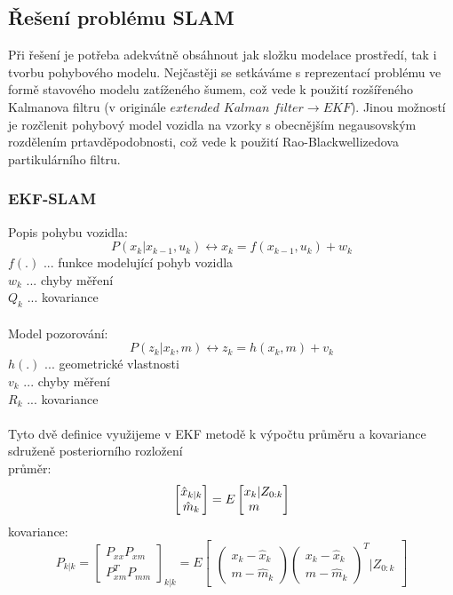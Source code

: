 \documentclass[11pt]{article}
\begin{document}
\subsection{Řešení problému SLAM}
Při řešení je potřeba adekvátně obsáhnout jak složku modelace prostředí, tak i tvorbu pohybového modelu. Nejčastěji se setkáváme s reprezentací problému ve formě stavového modelu zatíženého šumem, což vede k použití rozšířeného Kalmanova filtru (v originále $extended$ $Kalman$ $filter\rightarrow EKF$). Jinou možností je rozčlenit pohybový model vozidla na vzorky s obecnějším negausovským rozdělením prtavděpodobnosti, což vede k použití Rao-Blackwellizedova partikulárního filtru. 

\subsubsection{EKF-SLAM}
Popis pohybu vozidla:
$$P(x_k|x_{k-1},u_k)\leftrightarrow x_k=f(x_{k-1},u_k)+w_k$$
$f(.)$ ... funkce modelující pohyb vozidla\\
$w_k$ ... chyby měření\\
$Q_k$ ... kovariance\\
\\
Model pozorování:
$$P(z_k|x_k,m)\leftrightarrow z_k=h(x_k,m)+v_k $$
$h(.)$ ... geometrické vlastnosti\\
$v_k$ ... chyby měření\\
$R_k$ ... kovariance\\
\\
Tyto dvě definice využijeme v EKF metodě k výpočtu průměru a kovariance sdruženě posteriorního rozložení\\
\indent průměr:
$$\begin{bmatrix}
\hat{x}_{k|k}\\\hat{m}_k
\end{bmatrix}=E
\begin{bmatrix}
x_k |Z_{0:k}\\m\indent
\end{bmatrix}$$ 
\indent kovariance:
$$P_{k|k}=\begin{bmatrix}
P_{xx} P_{xm}\\P^T_{xm} P_{mm}
\end{bmatrix}_{k|k}=E\begin{bmatrix}
\begin{pmatrix}
x_k-\hat{x}_k\\m-\hat{m}_k
\end{pmatrix} \begin{pmatrix}
x_k-\hat{x}_k\\m-\hat{m}_k
\end{pmatrix}^T |Z_{0:k}
\end{bmatrix}$$\\
\end{document}

